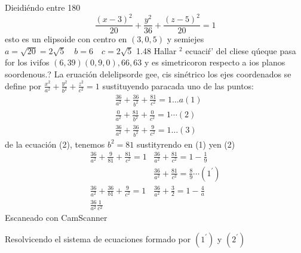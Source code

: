 Dieidiéndo entre 180
$$
\frac{(x-3)^2}{20}+\frac{y^2}{36}+\frac{(z-5)^2}{20}=1
$$
esto es un elipsoide con centro en $(3,0,5)$ y
semiejes $a=\sqrt{20}=2 \sqrt{5} \quad b=6 \quad c=2 \sqrt{5}$
1.48 Hallar ${ }^2$ ecuaciŕ' del cliese qúeque pasa for los ivifos $(6,39)(0,9,0), 66,63$ y es simetricoron respecto a ios planos soordenous.?
La eruación delelipsorde gee, cis sinétrico los ejes coordenados se define por $\frac{x^2}{a^2}+\frac{y^2}{b^2}+\frac{z^2}{c^2}=1$ sustituyendo paracada uno de las puntos:
$$
\begin{aligned}
	& \frac{36}{a^2}+\frac{36}{b^2}+\frac{81}{c^2}=1 \ldots a(1) \\
	& \frac{0}{a^2}+\frac{81}{b^2}+\frac{0}{c^2}=1 \cdots(2) \\
	& \frac{36}{a^2}+\frac{36}{b^2}+\frac{9}{c^2}=1 \ldots(3)
\end{aligned}
$$
de la ecuación (2), tenemos $b^2=81$
sustityrendo en (1) yen (2)
$$
\begin{array}{ll}
	\frac{36}{a^2}+\frac{9}{81}+\frac{81}{c^2}=1 & \frac{36}{a^2}+\frac{81}{c^2}=1-\frac{1}{9} \\
	& \frac{36}{a^2}+\frac{81}{c^2}=\frac{8}{9} \cdots\left(1^{\prime}\right) \\
	\frac{36}{a^2}+\frac{36}{b 1}+\frac{9}{c^2}=1 & \frac{36}{a^2}+\frac{3}{2}=1-\frac{4}{a} \\
	\frac{36}{a^2} \frac{1}{c^2} &
\end{array}
$$
Escaneado con CamScanner




Resolvicendo el sistema de ecuaciones formado por $\left(1^{\prime}\right)$ y $\left(2^{\prime}\right)$

